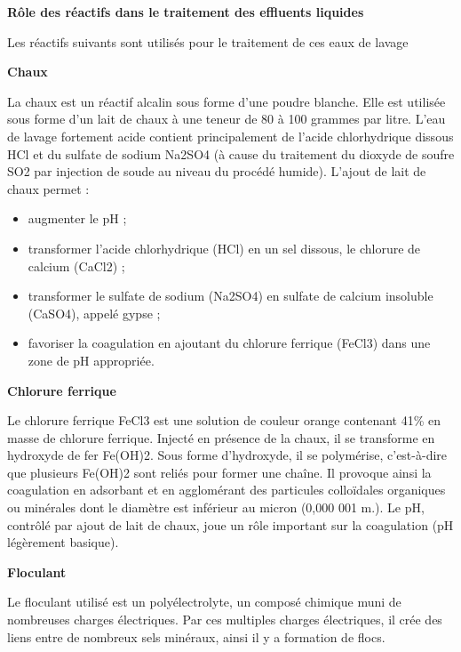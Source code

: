 \newpage
\textbf{Rôle des réactifs dans le traitement des effluents liquides}
\vspace{0.3cm}

Les réactifs suivants sont utilisés pour le traitement de ces eaux de lavage

\vspace{0.3cm}
\textbf{Chaux}
\vspace{0.3cm}

La chaux est un réactif alcalin sous forme d’une poudre blanche. Elle est utilisée sous forme d’un lait de chaux à une teneur de 80 à 100 grammes par litre.
L’eau de lavage fortement acide contient principalement de l’acide chlorhydrique dissous HCl et du sulfate de sodium Na2SO4 (à cause du traitement du dioxyde de soufre SO2 par injection de soude au niveau du procédé humide).
L’ajout de lait de chaux permet :
\begin{itemize}

 \item  augmenter le pH ;
 \item transformer l'acide chlorhydrique (HCl) en un sel dissous, le chlorure de calcium (CaCl2) ;
 \item transformer le sulfate de sodium (Na2SO4) en sulfate de calcium insoluble (CaSO4), appelé gypse ;
 \item  favoriser la coagulation en ajoutant du chlorure ferrique (FeCl3) dans une zone de pH appropriée.
  
\end{itemize}

\vspace{0.3cm}
\textbf{Chlorure ferrique}
\vspace{0.3cm}

Le chlorure ferrique FeCl3 est une solution de couleur orange contenant 41\% en masse de chlorure ferrique.
Injecté en présence de la chaux, il se transforme en hydroxyde de fer Fe(OH)2.
Sous forme d’hydroxyde, il se polymérise, c’est-à-dire que plusieurs Fe(OH)2 sont reliés pour former une chaîne. Il provoque ainsi la coagulation en adsorbant et en agglomérant des particules colloïdales organiques ou minérales dont le diamètre est inférieur au micron (0,000 001 m.).
Le pH, contrôlé par ajout de lait de chaux, joue un rôle important sur la coagulation (pH légèrement basique).

\vspace{0.3cm}
\textbf{Floculant}
\vspace{0.3cm}

Le floculant utilisé est un polyélectrolyte, un composé chimique muni de nombreuses charges électriques. Par ces multiples charges électriques, il crée des liens entre de nombreux sels minéraux, ainsi il y a formation de flocs.
\vspace{0.3cm}

